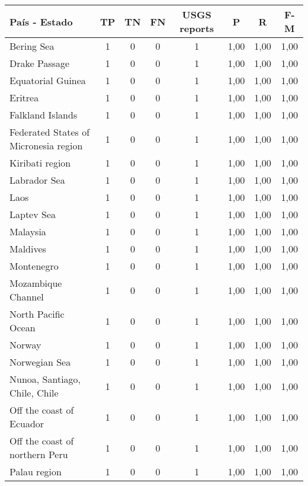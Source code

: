 {\small
\begin{table}[!ht]
\centering
  \begin{tabular}{|l|ccc|c|ccc|}
  \hline
  País - Estado & TP & TN & FN & USGS reports & P & R & F-M \\
  \hline \hline
Bering Sea	 & 1 	 & 0   	 & 0   	& 1	 & 1,00 &	1,00 &	1,00 \\ \hline
Drake Passage	 & 1 	 & 0   	 & 0   	& 1	 & 1,00 &	1,00 &	1,00 \\ \hline
Equatorial Guinea	 & 1 	 & 0   	 & 0   	& 1	 & 1,00 &	1,00 &	1,00 \\ \hline
Eritrea	 & 1 	 & 0   	 & 0   	& 1	 & 1,00 &	1,00 &	1,00 \\ \hline
Falkland Islands	 & 1 	 & 0   	 & 0   	& 1	 & 1,00 &	1,00 &	1,00 \\ \hline
Federated States of Micronesia region	 & 1 	 & 0   	 & 0   	& 1	 & 1,00 &	1,00 &	1,00 \\ \hline
Kiribati region	 & 1 	 & 0   	 & 0   	& 1	 & 1,00 &	1,00 &	1,00 \\ \hline
Labrador Sea	 & 1 	 & 0   	 & 0   	& 1	 & 1,00 &	1,00 &	1,00 \\ \hline
Laos	 & 1 	 & 0   	 & 0   	& 1	 & 1,00 &	1,00 &	1,00 \\ \hline
Laptev Sea	 & 1 	 & 0   	 & 0   	& 1	 & 1,00 &	1,00 &	1,00 \\ \hline
Malaysia	 & 1 	 & 0   	 & 0   	& 1	 & 1,00 &	1,00 &	1,00 \\ \hline
Maldives	 & 1 	 & 0   	 & 0   	& 1	 & 1,00 &	1,00 &	1,00 \\ \hline
Montenegro	 & 1 	 & 0   	 & 0   	& 1	 & 1,00 &	1,00 &	1,00 \\ \hline
Mozambique Channel	 & 1 	 & 0   	 & 0   	& 1	 & 1,00 &	1,00 &	1,00 \\ \hline
North Pacific Ocean	 & 1 	 & 0   	 & 0   	& 1	 & 1,00 &	1,00 &	1,00 \\ \hline
Norway	 & 1 	 & 0   	 & 0   	& 1	 & 1,00 &	1,00 &	1,00 \\ \hline
Norwegian Sea	 & 1 	 & 0   	 & 0   	& 1	 & 1,00 &	1,00 &	1,00 \\ \hline
Nunoa, Santiago, Chile, Chile	 & 1 	 & 0   	 & 0   	& 1	 & 1,00 &	1,00 &	1,00 \\ \hline
Off the coast of Ecuador	 & 1 	 & 0   	 & 0   	& 1	 & 1,00 &	1,00 &	1,00 \\ \hline
Off the coast of northern Peru	 & 1 	 & 0   	 & 0   	& 1	 & 1,00 &	1,00 &	1,00 \\ \hline
Palau region	 & 1 	 & 0   	 & 0   	& 1	 & 1,00 &	1,00 &	1,00 \\ \hline

\end{tabular}
\end{table}}
